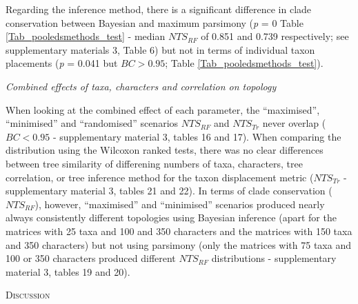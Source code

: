 \documentclass[12pt,letterpaper]{article}
\renewcommand{\section}[1]{%
\bigskip
\begin{center}
\begin{Large}
\normalfont\scshape #1
\medskip
\end{Large}
\end{center}}
\renewcommand{\subsection}[1]{%
\bigskip
\begin{center}
\begin{large}
\normalfont\itshape #1
\end{large}
\end{center}}
\begin{document}
Regarding the inference method, there is a significant difference in clade conservation between Bayesian and maximum parsimony (\textit{p} = 0 Table \ref{Tab_pooledsmethods_test} - median $NTS_{RF}$ of 0.851 and 0.739 respectively; see supplementary materials 3, Table 6) but not in terms of individual taxon placements (\textit{p} = 0.041 but $BC > 0.95$; Table \ref{Tab_pooledsmethods_test}).




\subsection{Combined effects of taxa, characters and correlation on topology}

When looking at the combined effect of each parameter, the ``maximised'', ``minimised'' and ``randomised'' scenarios $NTS_{RF}$ and $NTS_{Tr}$ never overlap ($BC < 0.95$ - supplementary material 3, tables 16 and 17).
When comparing the distribution using the Wilcoxon ranked tests, there was no clear differences  between  tree similarity of differening numbers of taxa, characters, tree correlation, or tree inference method for the taxon displacement metric ($NTS_{Tr}$ - supplementary material 3, tables 21 and 22).
In terms of clade conservation ($NTS_{RF}$), however, ``maximised'' and ``minimised'' scenarios produced nearly always consistently different topologies using Bayesian inference (apart for the matrices with 25 taxa and 100 and 350 characters and the matrices with 150 taxa and 350 characters) but not using parsimony (only the matrices with 75 taxa and 100 or 350 characters produced different $NTS_{RF}$ distributions - supplementary material 3, tables 19 and 20).

\section{Discussion}
\end{document}
